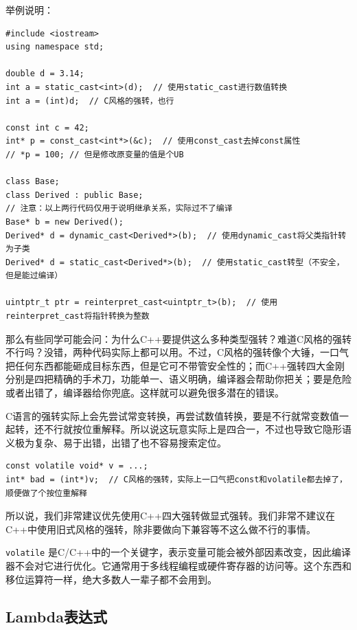 举例说明：
\begin{verbatim}
#include <iostream>
using namespace std;

double d = 3.14;
int a = static_cast<int>(d);  // 使用static_cast进行数值转换
int a = (int)d;  // C风格的强转，也行

const int c = 42;
int* p = const_cast<int*>(&c);  // 使用const_cast去掉const属性
// *p = 100; // 但是修改原变量的值是个UB

class Base;
class Derived : public Base;
// 注意：以上两行代码仅用于说明继承关系，实际过不了编译
Base* b = new Derived();
Derived* d = dynamic_cast<Derived*>(b);  // 使用dynamic_cast将父类指针转为子类
Derived* d = static_cast<Derived*>(b);  // 使用static_cast转型（不安全，但是能过编译）

uintptr_t ptr = reinterpret_cast<uintptr_t>(b);  // 使用reinterpret_cast将指针转换为整数
\end{verbatim}

那么有些同学可能会问：为什么C++要提供这么多种类型强转？难道C风格的强转不行吗？没错，两种代码实际上都可以用。不过，C风格的强转像个大锤，一口气把任何东西都能砸成目标东西，但是它可不带管安全性的；而C++强转四大金刚分别是四把精确的手术刀，功能单一、语义明确，编译器会帮助你把关；要是危险或者出错了，编译器给你兜底。这样就可以避免很多潜在的错误。

C语言的强转实际上会先尝试常变转换，再尝试数值转换，要是不行就常变数值一起转，还不行就按位重解释。所以说这玩意实际上是四合一，不过也导致它隐形语义极为复杂、易于出错，出错了也不容易搜索定位。

\begin{verbatim}
const volatile void* v = ...;
int* bad = (int*)v;  // C风格的强转，实际上一口气把const和volatile都去掉了，顺便做了个按位重解释
\end{verbatim}

所以说，我们非常建议优先使用C++四大强转做显式强转。我们非常不建议在C++中使用旧式风格的强转，除非要做向下兼容等不这么做不行的事情。

\begin{note}
  \texttt{volatile} 是C/C++中的一个关键字，表示变量可能会被外部因素改变，因此编译器不会对它进行优化。它通常用于多线程编程或硬件寄存器的访问等。这个东西和移位运算符一样，绝大多数人一辈子都不会用到。
\end{note}

\subsection{Lambda表达式}

